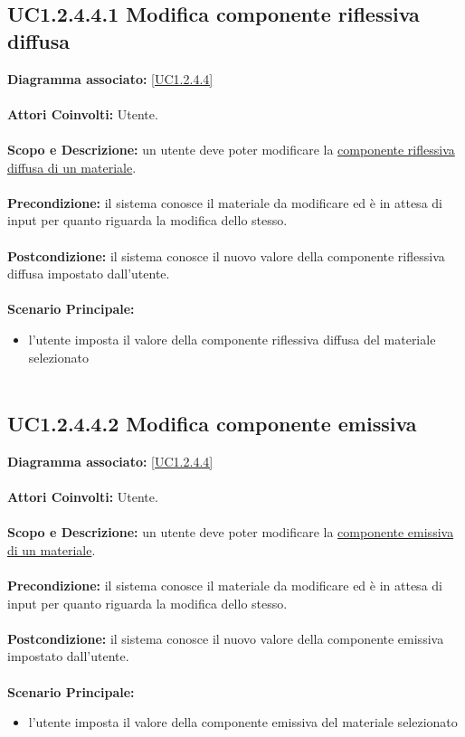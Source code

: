 \subsection{UC1.2.4.4.1 Modifica componente riflessiva diffusa}
\textbf{Diagramma associato:}
\ref{UC1.2.4.4} \\ \\
\textbf{Attori Coinvolti:}
Utente. \\ \\
\textbf{Scopo e Descrizione:}
un utente deve poter modificare la \underline{componente riflessiva diffusa di un materiale}. \\ \\
\textbf{Precondizione:}
il sistema conosce il materiale da modificare ed è in attesa di input per quanto riguarda la modifica dello stesso. \\ \\
\textbf{Postcondizione:}
il sistema conosce il nuovo valore della componente riflessiva diffusa impostato dall'utente. \\ \\
\textbf{Scenario Principale:}
\begin{itemize}
\item l'utente imposta il valore della componente riflessiva diffusa del materiale selezionato
\\ \\ \end{itemize}


\subsection{UC1.2.4.4.2 Modifica componente emissiva}
\textbf{Diagramma associato:}
\ref{UC1.2.4.4} \\ \\
\textbf{Attori Coinvolti:}
Utente. \\ \\
\textbf{Scopo e Descrizione:}
un utente deve poter modificare la \underline{componente emissiva di un materiale}. \\ \\
\textbf{Precondizione:}
il sistema conosce il materiale da modificare ed è in attesa di input per quanto riguarda la modifica dello stesso. \\ \\
\textbf{Postcondizione:}
il sistema conosce il nuovo valore della componente emissiva impostato dall'utente. \\ \\
\textbf{Scenario Principale:}
\begin{itemize}
\item l'utente imposta il valore della componente emissiva del materiale selezionato
\\ \\ \end{itemize}


